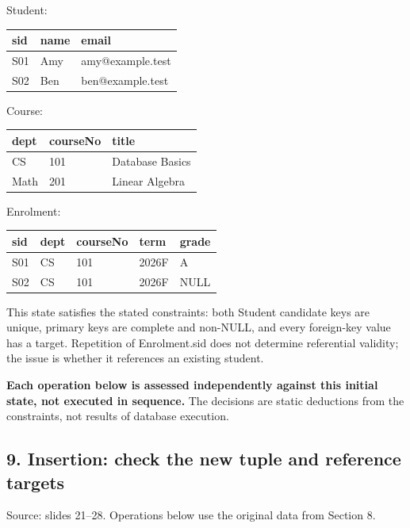 Student:

\begin{longtable}[]{@{}lll@{}}
\toprule\noalign{}
sid & name & email \\
\midrule\noalign{}
\endhead
\bottomrule\noalign{}
\endlastfoot
S01 & Amy & amy@example.test \\
S02 & Ben & ben@example.test \\
\end{longtable}

Course:

\begin{longtable}[]{@{}lll@{}}
\toprule\noalign{}
dept & courseNo & title \\
\midrule\noalign{}
\endhead
\bottomrule\noalign{}
\endlastfoot
CS & 101 & Database Basics \\
Math & 201 & Linear Algebra \\
\end{longtable}

Enrolment:

\begin{longtable}[]{@{}lllll@{}}
\toprule\noalign{}
sid & dept & courseNo & term & grade \\
\midrule\noalign{}
\endhead
\bottomrule\noalign{}
\endlastfoot
S01 & CS & 101 & 2026F & A \\
S02 & CS & 101 & 2026F & NULL \\
\end{longtable}

This state satisfies the stated constraints: both Student candidate keys are unique, primary keys are complete and non-NULL, and every foreign-key value has a target. Repetition of Enrolment.sid does not determine referential validity; the issue is whether it references an existing student.

\textbf{Each operation below is assessed independently against this initial state, not executed in sequence.} The decisions are static deductions from the constraints, not results of database execution.

\subsection{9. Insertion: check the new tuple and reference targets}\label{03_relational_model_and_integrity_en-insertion-check-the-new-tuple-and-reference-targets}

Source: slides 21--28. Operations below use the original data from Section 8.

